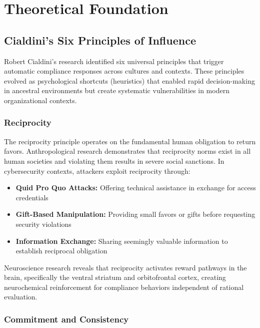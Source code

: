\documentclass[11pt,a4paper]{article}
\begin{document}
\section{Theoretical Foundation}

\subsection{Cialdini's Six Principles of Influence}

Robert Cialdini's research\cite{cialdini2007} identified six universal principles that trigger automatic compliance responses across cultures and contexts. These principles evolved as psychological shortcuts (heuristics) that enabled rapid decision-making in ancestral environments but create systematic vulnerabilities in modern organizational contexts.

\subsubsection{Reciprocity}

The reciprocity principle operates on the fundamental human obligation to return favors. Anthropological research demonstrates that reciprocity norms exist in all human societies and violating them results in severe social sanctions\cite{gouldner1960}. In cybersecurity contexts, attackers exploit reciprocity through:

\begin{itemize}
\item \textbf{Quid Pro Quo Attacks:} Offering technical assistance in exchange for access credentials
\item \textbf{Gift-Based Manipulation:} Providing small favors or gifts before requesting security violations
\item \textbf{Information Exchange:} Sharing seemingly valuable information to establish reciprocal obligation
\end{itemize}

Neuroscience research reveals that reciprocity activates reward pathways in the brain, specifically the ventral striatum and orbitofrontal cortex\cite{rilling2002}, creating neurochemical reinforcement for compliance behaviors independent of rational evaluation.

\subsubsection{Commitment and Consistency}
\end{document}
